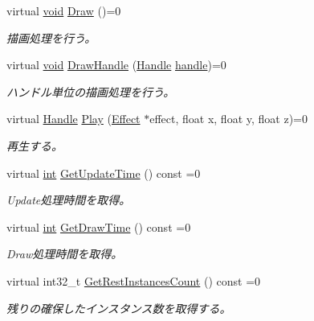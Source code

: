 \begin{DoxyCompactItemize}
virtual \mbox{\hyperlink{namespace_effekseer_ab34c4088e512200cf4c2716f168deb56}{void}} \mbox{\hyperlink{class_effekseer_1_1_manager_a17431b7d96325535fa62bcbb066f0a9c}{Draw}} ()=0
\begin{DoxyCompactList}\small\item\em 描画処理を行う。 \end{DoxyCompactList}\item 
virtual \mbox{\hyperlink{namespace_effekseer_ab34c4088e512200cf4c2716f168deb56}{void}} \mbox{\hyperlink{class_effekseer_1_1_manager_a9eaa0c0f968351b53c46f9735cc40a79}{Draw\+Handle}} (\mbox{\hyperlink{namespace_effekseer_afba58b8d812da862190e9bbfc040824a}{Handle}} \mbox{\hyperlink{namespace_effekseer_afd99b336b206999bdcca3e431648efbc}{handle}})=0
\begin{DoxyCompactList}\small\item\em ハンドル単位の描画処理を行う。 \end{DoxyCompactList}\item 
virtual \mbox{\hyperlink{namespace_effekseer_afba58b8d812da862190e9bbfc040824a}{Handle}} \mbox{\hyperlink{class_effekseer_1_1_manager_a5ea3211a3670843061238976dda54a4f}{Play}} (\mbox{\hyperlink{class_effekseer_1_1_effect}{Effect}} $\ast$effect, float x, float y, float z)=0
\begin{DoxyCompactList}\small\item\em 再生する。 \end{DoxyCompactList}\item 
virtual \mbox{\hyperlink{namespace_effekseer_ace0abf7c2e6947e519ebe8b54cbcc30a}{int}} \mbox{\hyperlink{class_effekseer_1_1_manager_a0f5a05a0911243b56fe6aaa259d677df}{Get\+Update\+Time}} () const =0
\begin{DoxyCompactList}\small\item\em Update処理時間を取得。 \end{DoxyCompactList}\item 
virtual \mbox{\hyperlink{namespace_effekseer_ace0abf7c2e6947e519ebe8b54cbcc30a}{int}} \mbox{\hyperlink{class_effekseer_1_1_manager_a24c2805010a8fe5eca1115d48d8c5522}{Get\+Draw\+Time}} () const =0
\begin{DoxyCompactList}\small\item\em Draw処理時間を取得。 \end{DoxyCompactList}\item 
virtual int32\+\_\+t \mbox{\hyperlink{class_effekseer_1_1_manager_acd60c8fb65e5189dd9fb5ed7d3e7cc71}{Get\+Rest\+Instances\+Count}} () const =0
\begin{DoxyCompactList}\small\item\em 残りの確保したインスタンス数を取得する。 \end{DoxyCompactList}\item 

\end{DoxyCompactItemize}

